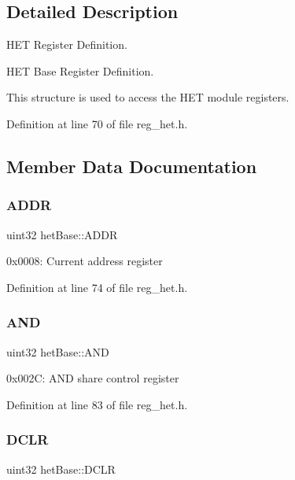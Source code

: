 \subsection{Detailed Description}
H\+ET Register Definition. 

H\+ET Base Register Definition.

This structure is used to access the H\+ET module registers. 

Definition at line 70 of file reg\+\_\+het.\+h.



\subsection{Member Data Documentation}
\mbox{\label{structhetBase_a2a49654a88587688ed901d5233a04836}} 
\subsubsection{\texorpdfstring{A\+D\+DR}{ADDR}}
{\footnotesize\ttfamily uint32 het\+Base\+::\+A\+D\+DR}

0x0008\+: Current address register 

Definition at line 74 of file reg\+\_\+het.\+h.

\mbox{\label{structhetBase_af69f69e894780b741409bc2fff886675}} 
\subsubsection{\texorpdfstring{A\+ND}{AND}}
{\footnotesize\ttfamily uint32 het\+Base\+::\+A\+ND}

0x002C\+: A\+ND share control register 

Definition at line 83 of file reg\+\_\+het.\+h.

\mbox{\label{structhetBase_a5596ac69a94a3889d96420ff5d3f9228}} 
\subsubsection{\texorpdfstring{D\+C\+LR}{DCLR}}
{\footnotesize\ttfamily uint32 het\+Base\+::\+D\+C\+LR}


